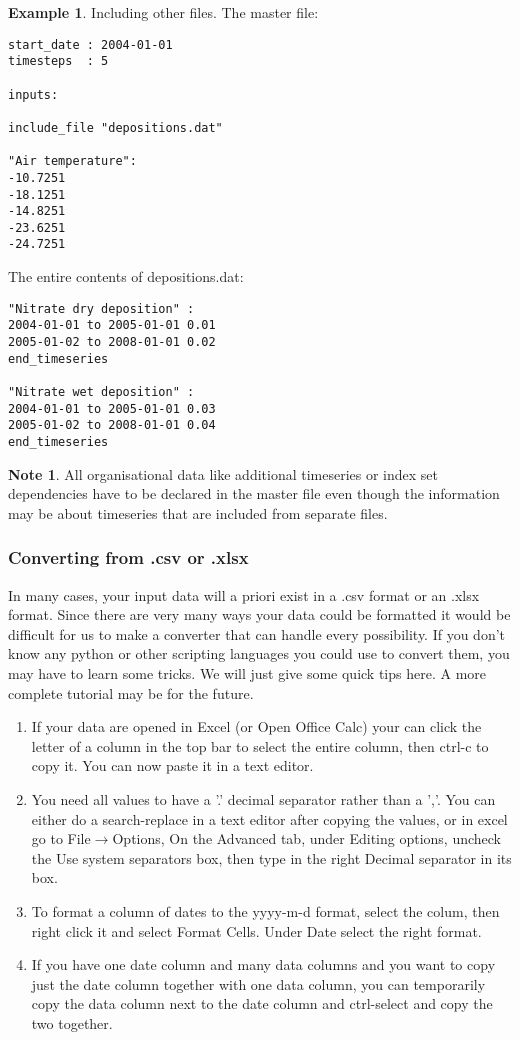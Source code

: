 \documentclass[11pt]{article}
\theoremstyle{definition}
\newtheorem{mynote}{Note}
\newenvironment{note}%
  {\begin{lrbox}{\notebox}%
   \begin{minipage}{\dimexpr\linewidth-2\fboxsep}
   \begin{mynote}}%
  {\end{mynote}%
   \end{minipage}%
   \end{lrbox}%
   \begin{trivlist}
     \item[]\colorbox{silver}{\usebox\notebox}
   \end{trivlist}}
\newtheorem{myexample}{Example}
\newenvironment{example}%
  {\begin{lrbox}{\examplebox}%
   \begin{minipage}{\dimexpr\linewidth-2\fboxsep}
   \begin{myexample}}%
  {\end{myexample}%
   \end{minipage}%
   \end{lrbox}%
   \begin{trivlist}
     \item[]\colorbox{silver}{\usebox\examplebox}
   \end{trivlist}}
\begin{document}
\begin{example}
Including other files. The master file:
\begin{lstlisting}
start_date : 2004-01-01
timesteps  : 5

inputs:

include_file "depositions.dat"

"Air temperature":
-10.7251
-18.1251
-14.8251
-23.6251
-24.7251
\end{lstlisting}
The entire contents of depositions.dat:
\begin{lstlisting}
"Nitrate dry deposition" :
2004-01-01 to 2005-01-01 0.01
2005-01-02 to 2008-01-01 0.02
end_timeseries

"Nitrate wet deposition" :
2004-01-01 to 2005-01-01 0.03
2005-01-02 to 2008-01-01 0.04
end_timeseries
\end{lstlisting}
\end{example}

\begin{note}
All organisational data like additional timeseries or index set dependencies have to be declared in the master file even though the information may be about timeseries that are included from separate files.
\end{note}


\subsubsection{Converting from .csv or .xlsx}
In many cases, your input data will a priori exist in a .csv format or an .xlsx format. Since there are very many ways your data could be formatted it would be difficult for us to make a converter that can handle every possibility. If you don't know any python or other scripting languages you could use to convert them, you may have to learn some tricks. We will just give some quick tips here. A more complete tutorial may be for the future.

\begin{enumerate}[i]
\item If your data are opened in Excel (or Open Office Calc) your can click the letter of a column in the top bar to select the entire column, then ctrl-c to copy it. You can now paste it in a text editor.
\item You need all values to have a '.' decimal separator rather than a ','. You can either do a search-replace in a text editor after copying the values, or in excel go to File$\rightarrow$Options, On the Advanced tab, under Editing options, uncheck the Use system separators box, then type in the right Decimal separator in its box.
\item To format a column of dates to the yyyy-m-d format, select the colum, then right click it and select Format Cells. Under Date select the right format.
\item If you have one date column and many data columns and you want to copy just the date column together with one data column, you can temporarily copy the data column next to the date column and ctrl-select and copy the two together.
\end{enumerate}
\end{document}
